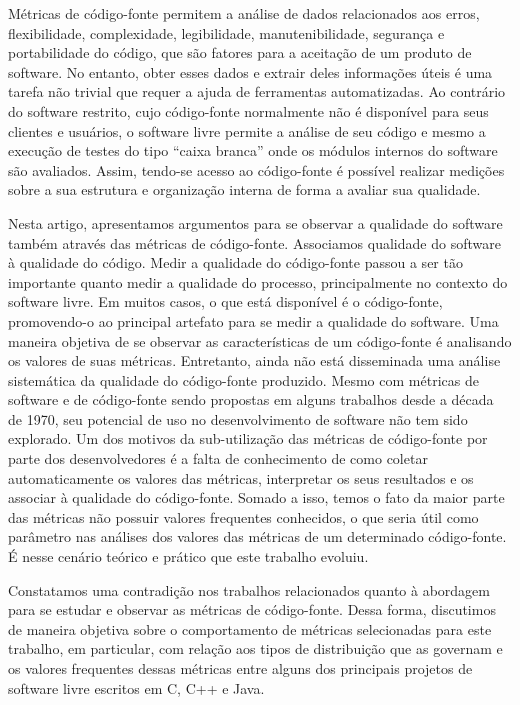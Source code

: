 \documentclass{llncs}
\begin{document}
Métricas de código-fonte permitem a análise de dados relacionados aos erros,
flexibilidade, complexidade, legibilidade, manutenibilidade, segurança e
portabilidade do código, que são fatores para a aceitação de um produto de
software.
%
No entanto, obter esses dados e extrair deles informações úteis é uma tarefa
não trivial que requer a ajuda de ferramentas automatizadas.
%
Ao contrário do software restrito, cujo código-fonte normalmente não é
disponível para seus clientes e usuários, o software livre permite a análise de
seu código e  mesmo a execução de testes do tipo ``caixa branca'' onde os
módulos internos do software são avaliados.
%
Assim, tendo-se acesso ao código-fonte é possível realizar medições sobre a sua
estrutura e organização interna de forma a avaliar sua qualidade.

Nesta artigo, apresentamos argumentos para se observar a qualidade do software
também através das métricas de código-fonte.
%
Associamos qualidade do software à qualidade do código. Medir a qualidade do
código-fonte passou a ser tão importante quanto medir a qualidade do processo,
principalmente no contexto do software livre.
%
Em muitos casos, o que está disponível é o código-fonte, promovendo-o ao
principal artefato para se medir a qualidade do software. Uma maneira objetiva
de se observar as ca\-rac\-te\-rís\-ti\-cas de um código-fonte é analisando os
valores de suas métricas. 
%
Entretanto, ainda não está disseminada uma análise sistemática da qualidade do
código-fonte produzido.
%
Mesmo com métricas de software e de código-fonte sendo propostas em alguns
trabalhos desde a década de 1970, seu potencial de uso no desenvolvimento de
software não tem sido explorado.
%
Um dos motivos da sub-utilização das métricas de código-fonte por parte dos
desenvolvedores é a falta de conhecimento de como coletar automaticamente os
valores das métricas, interpretar os seus resultados e os associar à qualidade
do código-fonte.
%
Somado a isso, temos o fato da maior parte das métricas não possuir valores
frequentes conhecidos, o que seria útil como parâmetro nas análises dos valores
das métricas de um determinado código-fonte.
%
É nesse cenário teórico e prático que este trabalho evoluiu.

Constatamos uma contradição nos trabalhos relacionados quanto à abordagem para
se estudar e observar as métricas de código-fonte.
%
Dessa forma, discutimos de maneira objetiva sobre o comportamento de métricas
selecionadas para este trabalho, em particular, com relação aos tipos de
distribuição que as governam e os valores frequentes dessas métricas entre
alguns dos principais projetos de software livre escritos em C,  C++ e Java.
\end{document}
